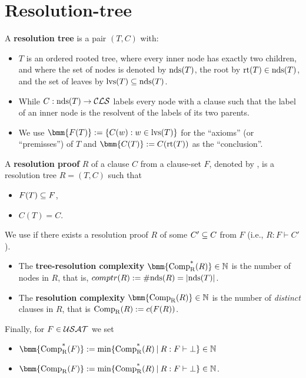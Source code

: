 \documentclass[12pt]{book}
\begin{document}
\section{Resolution-tree}
\label{sec:Resolution-tree}

\begin{defi}\label{def:restree}
  A \textbf{resolution tree} is a pair $(T,C)$ with:
  \begin{itemize}
  \item $T$ is an ordered rooted tree, where every inner node has exactly two children, and where the set of nodes is denoted 
  by $\operatorname{nds}(T)$, the root by $\operatorname{rt}(T) \in \operatorname{nds}(T)$, and the set of leaves by $\operatorname{lvs}(T) \subseteq \operatorname{nds}(T)$.
  \item While $C: \operatorname{nds}(T) \rightarrow \mathcal{CLS}$ labels every node with a clause such that the label of an inner node is the resolvent of the labels of its two parents.
  \item We use $\bmm{F(T)} := \set{C(w) : w \in \lvs(T)}$ for the ``axioms'' (or ``premisses'') of $T$ and $\bmm{C(T)} := C(\rt(T))$ as the ``conclusion''.
  \end{itemize}
\end{defi}
\begin{defi}\label{def:resproof}
  A \textbf{resolution proof} $R$ of a clause $C$ from a clause-set $F$, denoted by , is a resolution tree $R = (T,C)$ such that
  \begin{itemize}
  \item $F(T) \subseteq F$,
  \item $C(T) = C$.
  \end{itemize}
  We use  if there exists a resolution proof $R$ of some $C' \subseteq C$ from $F$ (i.e., $R: F \vdash C'$). 
  \begin{itemize}
  \item The \textbf{tree-resolution complexity} $\bmm{\comptr(R)} \in \NN$ is the number of nodes in $R$, that is, $comptr(R) := \operatorname{\#nds}(R) = \lvert \operatorname{nds}(T) \rvert$.
  \item The \textbf{resolution complexity} $\bmm{\compr(R)} \in \NN$ is the number of \emph{distinct} clauses in $R$, that is $\operatorname{\operatorname{Comp}_R}(R) := c(F(R))$.
  \end{itemize}
  Finally, for $F \in \mathcal{USAT}$ we set
  \begin{itemize}
  \item $\bmm{\comptr(F)} := \min \set{\comptr(R) \mb R : F \vdash \bot} \in \NN$
  \item $\bmm{\compr(F)} := \min \set{\comptr(R) \mb R : F \vdash \bot} \in \NN$.
  \end{itemize}
\end{defi}
\end{document}
